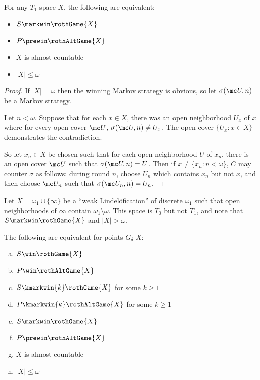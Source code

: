   \begin{thm}
    For any $T_1$ space $X$, the following are equivalent:
    \begin{itemize}
      \item $S\markwin\rothGame{X}$
      \item $P\prewin\rothAltGame{X}$
      \item $X$ is almost countable
      \item $|X|\leq\omega$
    \end{itemize}
  \end{thm}

  \begin{proof}
    If $|X|=\omega$ then the winning Markov strategy is obvious, so let $\sigma(\mc U,n)$ be a Markov strategy.

    Let $n<\omega$. Suppose that for each $x\in X$, there was an open neighborhood $U_x$ of $x$ where for every open cover $\mc U$, $\sigma(\mc U,n) \not= U_x$. The open cover $\{U_x : x\in X\}$ demonstrates the contradiction.

    So let $x_n\in X$ be chosen such that for each open neighborhood $U$ of $x_n$, there is an open cover $\mc U$ such that $\sigma(\mc U,n)=U$. Then if $x\not=\{x_n : n<\omega\}$, $C$ may counter $\sigma$ as follows: during round $n$, choose $U_n$ which contains $x_n$ but not $x$, and then choose $\mc U_n$ such that $\sigma(\mc U_n,n)=U_n$.
  \end{proof}

  \begin{ex}
    Let $X=\omega_1\cup\{\infty\}$ be a ``weak Lindel\"ofication'' of discrete $\omega_1$ such that open neighborhoods of $\infty$ contain $\omega_1\setminus\omega$. This space is $T_0$ but not $T_1$, and note that $S\markwin\rothGame{X}$ and $|X|>\omega$.
  \end{ex}

  \begin{thm}
    The following are equivalent for points-$G_\delta$ $X$:
      \begin{enumerate}[(a)]
        \item $S\win\rothGame{X}$
        \item $P\win\rothAltGame{X}$
        \item $S\kmarkwin{k}\rothGame{X}$ for some $k\geq 1$
        \item $P\kmarkwin{k}\rothAltGame{X}$ for some $k\geq 1$
        \item $S\markwin\rothGame{X}$
        \item $P\prewin\rothAltGame{X}$
        \item $X$ is almost countable
        \item $|X|\leq\omega$
      \end{enumerate}
  \end{thm}

